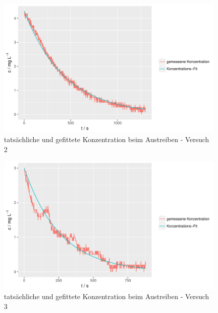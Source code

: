 \documentclass[12pt,liststotoc]{report}
\begin{document}
\begin{figure}[H]
\centering
\includegraphics[width=1\textwidth]{Graphics/austreiben_versuch-2.pdf} 
\caption[Austreiben Versuch 2]{tatsächliche und gefittete Konzentration beim Austreiben - Versuch 2}
\label{fig:c_aus_versuch2}
\end{figure}
\noindent

\begin{figure}[H]
\centering
\includegraphics[width=1\textwidth]{Graphics/austreiben_versuch-3.pdf} 
\caption[Austreiben Versuch 3]{tatsächliche und gefittete Konzentration beim Austreiben - Versuch 3}
\label{fig:c_aus_versuch3}
\end{figure}
\noindent
\end{document}
